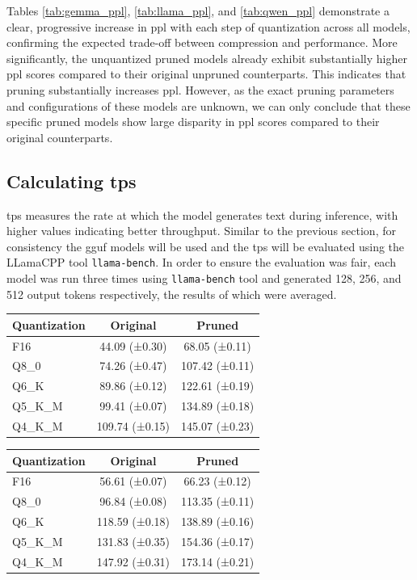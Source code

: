 \documentclass{ifacconf}
\begin{document}
	Tables \ref{tab:gemma_ppl}, \ref{tab:llama_ppl}, and \ref{tab:qwen_ppl} demonstrate a clear, progressive increase in \gls{ppl} with each step of quantization across all models, confirming the expected trade-off between compression and performance. More significantly, the unquantized pruned models already exhibit substantially higher \gls{ppl} scores compared to their original unpruned counterparts. This indicates that pruning substantially increases \gls{ppl}. However, as the exact pruning parameters and configurations of these models are unknown, we can only conclude that these specific pruned models show large disparity in \gls{ppl} scores compared to their original counterparts.
	
	\subsection{Calculating \gls{tps}}
	\gls{tps} measures the rate at which the model generates text during inference, with higher values indicating better throughput. Similar to the previous section, for consistency the \gls{gguf} models will be used and the \gls{tps} will be evaluated using the LLamaCPP tool \verb|llama-bench|. In order to ensure the evaluation was fair, each model was run three times using \verb|llama-bench| tool and generated 128, 256, and 512 output tokens respectively, the results of which were averaged.
	
	\begin{table}[H]
		\centering
		\begin{tabular}{|l|c|c|}
			\hline
			\textbf{Quantization} & \textbf{Original} & \textbf{Pruned} \\ \hline
			F16 & 44.09 (±0.30) & 68.05 (±0.11) \\ \hline
			Q8\_0 & 74.26 (±0.47) & 107.42 (±0.11) \\ \hline
			Q6\_K & 89.86 (±0.12) & 122.61 (±0.19) \\ \hline
			Q5\_K\_M & 99.41 (±0.07) & 134.89 (±0.18) \\ \hline
			Q4\_K\_M & 109.74 (±0.15) & 145.07 (±0.23) \\ \hline
		\end{tabular}
		\label{tab:gemma_tps}
	\end{table}
	
	\begin{table}[H]
		\centering
		\begin{tabular}{|l|c|c|}
			\hline
			\textbf{Quantization} & \textbf{Original} & \textbf{Pruned} \\ \hline
			F16 & 56.61 (±0.07) & 66.23 (±0.12) \\ \hline
			Q8\_0 & 96.84 (±0.08) & 113.35 (±0.11) \\ \hline
			Q6\_K & 118.59 (±0.18) & 138.89 (±0.16) \\ \hline
			Q5\_K\_M & 131.83 (±0.35) & 154.36 (±0.17) \\ \hline
			Q4\_K\_M & 147.92 (±0.31) & 173.14 (±0.21) \\ \hline
		\end{tabular}
		\label{tab:llama_tps}
	\end{table}
	
\end{document}

